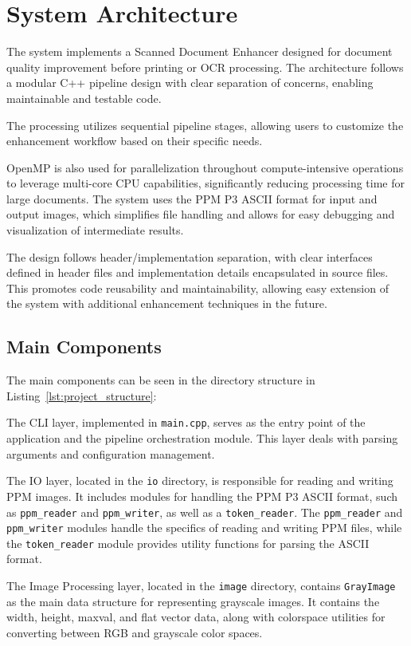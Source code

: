 \section{System Architecture}
\label{sec:systemarchitecture}

The system implements a Scanned Document Enhancer designed for document quality improvement before printing or OCR processing. The architecture follows a modular C++ pipeline design with clear separation of concerns, enabling maintainable and testable code.

The processing utilizes sequential pipeline stages, allowing users to customize the enhancement workflow based on their specific needs.

OpenMP is also used for parallelization throughout compute-intensive operations to leverage multi-core CPU capabilities, significantly reducing processing time for large documents. The system uses the PPM P3 ASCII format for input and output images, which simplifies file handling and allows for easy debugging and visualization of intermediate results.

The design follows header/implementation separation, with clear interfaces defined in header files and implementation details encapsulated in source files. This promotes code reusability and maintainability, allowing easy extension of the system with additional enhancement techniques in the future.

\subsection{Main Components}

The main components can be seen in the directory structure in Listing~\ref{lst:project_structure}:

The CLI layer, implemented in \texttt{main.cpp}, serves as the entry point of the application and the pipeline orchestration module. This layer deals with parsing arguments and configuration management.

The IO layer, located in the \texttt{io} directory, is responsible for reading and writing PPM images. It includes modules for handling the PPM P3 ASCII format, such as \texttt{ppm\_reader} and \texttt{ppm\_writer}, as well as a \texttt{token\_reader}. The \texttt{ppm\_reader} and \texttt{ppm\_writer} modules handle the specifics of reading and writing PPM files, while the \texttt{token\_reader} module provides utility functions for parsing the ASCII format.

The Image Processing layer, located in the \texttt{image} directory, contains \texttt{GrayImage} as the main data structure for representing grayscale images. It contains the width, height, maxval, and flat vector data, along with colorspace utilities for converting between RGB and grayscale color spaces.

